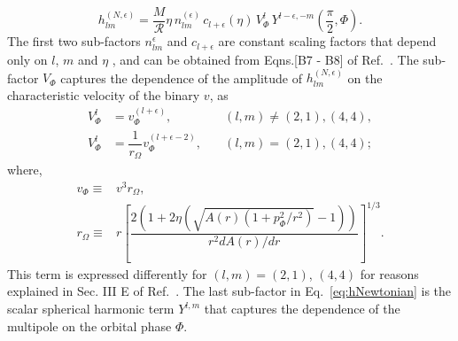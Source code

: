 \documentclass[aps,
prd,
amsmath,
amssymb,
twocolumn,
floatfix,
groupedaddress]{revtex4-1}
\newcommand{\ii}{{\rm i}}
\begin{document}
\begin{equation}\label{eq:hNewtonian}
h^{(N,\epsilon)}_{lm} = \dfrac{M}{\mathcal{R}}\eta\,n_{lm}^{(\epsilon)}\,c_{l+\epsilon}(\eta)\,V^l_{\Phi}\,Y^{l-\epsilon,-m}\left(\dfrac{\pi}{2},\Phi\right).
\end{equation}
The first two sub-factors $n_{lm}^{\epsilon}$ and $c_{l+\epsilon}$ are constant scaling factors that depend only on $l$, $m$ and $\eta$ \citep{BuonannoEOBTerms}, and can be obtained from Eqns.[B7 - B8] of Ref.~\citep{BuonannoEOBv2Main}. The sub-factor $V_{\Phi}$ captures the dependence of the amplitude of $h^{(N,\epsilon)}_{lm}$ on the characteristic velocity of the binary $v$, as 
\begin{subequations}
\begin{align}
V_{\Phi}^l &= v_{\Phi}^{(l+\epsilon)},\quad &(l,m) \neq (2,1) , (4,4),\\
V_{\Phi}^l &= \dfrac{1}{r_{\Omega}}v_{\Phi}^{(l+\epsilon-2)},\quad &(l,m) = (2,1) , (4,4);
\end{align}
\end{subequations}
where,
\begin{eqnarray}
v_{\Phi} \equiv & v^3 r_{\Omega},\\
r_{\Omega} \equiv & r\left[ \dfrac{2\left(1+2\eta\left(\sqrt{A(r)(1+p_{\Phi}^2/r^2)} -1 \right) \right)}{r^2dA(r)/dr} \right]^{1/3}.
\end{eqnarray}
This term is expressed differently for $(l,m)=(2,1)$, $(4,4)$ for reasons explained in Sec. III E of Ref.~\citep{BuonannoEOBv2Main}. The last sub-factor in Eq.~\eqref{eq:hNewtonian} is the scalar spherical harmonic term $Y^{l,m}$ that captures the dependence of the multipole on the orbital phase $\Phi$.
\end{document}

